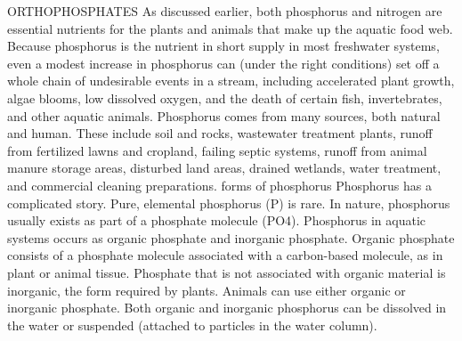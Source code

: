 \documentclass{article}
\begin{document}
ORTHOPHOSPHATES As discussed earlier, both phosphorus and nitrogen are
essential nutrients for the plants and animals that make up the aquatic
food web. Because phosphorus is the nutrient in short supply in most
freshwater systems, even a modest increase in phosphorus can (under the
right conditions) set off a whole chain of undesirable events in a
stream, including accelerated plant growth, algae blooms, low dissolved
oxygen, and the death of certain fish, invertebrates, and other aquatic
animals. Phosphorus comes from many sources, both natural and human.
These include soil and rocks, wastewater treatment plants, runoff from
fertilized lawns and cropland, failing septic systems, runoff from
animal manure storage areas, disturbed land areas, drained wetlands,
water treatment, and commercial cleaning preparations. forms of
phosphorus Phosphorus has a complicated story. Pure, elemental
phosphorus (P) is rare. In nature, phosphorus usually exists as part of
a phosphate molecule (PO4). Phosphorus in aquatic systems occurs as
organic phosphate and inorganic phosphate. Organic phosphate consists of
a phosphate molecule associated with a carbon-based molecule, as in
plant or animal tissue. Phosphate that is not associated with organic
material is inorganic, the form required by plants. Animals can use
either organic or inorganic phosphate. Both organic and inorganic
phosphorus can be dissolved in the water or suspended (attached to
particles in the water column).
\end{document}
